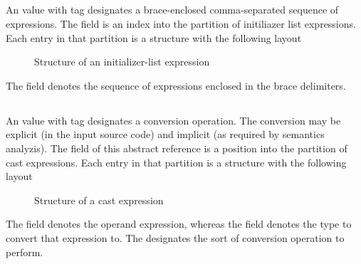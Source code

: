 
\subsection{}
\label{sec:ifc:ExprSort:InitializerList}

An  value with tag  designates a brace-enclosed comma-separated 
sequence of expressions.
The  field is an index into the partition of initiliazer list expressions.
Each entry in that partition is a structure with the following layout
%
\begin{figure}[H]
	\centering
	\caption{Structure of an initializer-list expression}
	\label{fig:ifc-initializer-list-structure}
\end{figure}
%
The  field denotes the sequence of expressions enclosed in the brace delimiters.




\subsection{}
\label{sec:ifc:ExprSort:Cast}

An  value with tag  designates a conversion operation.
The conversion may be explicit (in the input source code) and implicit (as required by semantics analyzis).
The  field of this abstract reference  is a position into the partition of cast expressions.
Each entry in that partition is a structure with the following layout
%
\begin{figure}[H]
	\centering
	\caption{Structure of a cast expression}
	\label{fig:ifc:ExprSort:Cast}
\end{figure}
%
The  field denotes the operand expression, whereas the  field denotes
the type to convert that expression to.  The  designates the sort of conversion operation
to perform.


